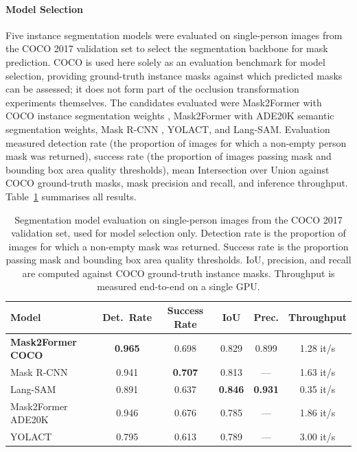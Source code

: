 \paragraph{Model Selection}
Five instance segmentation models were evaluated on 
single-person images from the COCO 2017 validation set 
\cite{Lin_2014_COCO} to select the segmentation backbone for 
mask prediction. COCO is used here solely as an evaluation 
benchmark for model selection, providing ground-truth instance 
masks against which predicted masks can be assessed; it does 
not form part of the occlusion transformation experiments 
themselves. The candidates evaluated were Mask2Former with 
COCO instance segmentation weights \cite{Cheng_2022_Mask2Former}, 
Mask2Former with ADE20K semantic segmentation weights, Mask 
R-CNN \cite{He_2017_MaskRCNN}, YOLACT, and Lang-SAM. 
Evaluation measured detection rate (the proportion of images 
for which a non-empty person mask was returned), success rate 
(the proportion of images passing mask and bounding box area 
quality thresholds), mean Intersection over Union against COCO 
ground-truth masks, mask precision and recall, and inference 
throughput. Table~\ref{tab:occlusion_model_eval} summarises 
all results.

\begin{table}[htbp]
	\centering
	\caption{Segmentation model evaluation on single-person 
		images from the COCO 2017 validation set, used 
		for model selection only. Detection rate is the 
		proportion of images for which a non-empty mask was 
		returned. Success rate is the proportion passing mask 
		and bounding box area quality thresholds. IoU, 
		precision, and recall are computed against COCO 
		ground-truth instance masks. Throughput is measured 
		end-to-end on a single GPU.}
	\label{tab:occlusion_model_eval}
	\begin{tabular}{lccccc}
		\hline
		\textbf{Model} & \textbf{Det.\ Rate} & 
		\textbf{Success Rate} & \textbf{IoU} & 
		\textbf{Prec.} & \textbf{Throughput} \\
		\hline
		\textbf{Mask2Former COCO} & \textbf{0.965} & 0.698 & 0.829 & 0.899 & 1.28 it/s \\
		Mask R-CNN                & 0.941 & \textbf{0.707} & 0.813 & ---   & 1.63 it/s \\
		Lang-SAM                  & 0.891 & 0.637 & \textbf{0.846} & \textbf{0.931} & 0.35 it/s \\
		Mask2Former ADE20K        & 0.946 & 0.676 & 0.785 & ---   & 1.86 it/s \\
		YOLACT                    & 0.795 & 0.613 & 0.789 & ---   & 3.00 it/s \\
		\hline
	\end{tabular}
\end{table}

